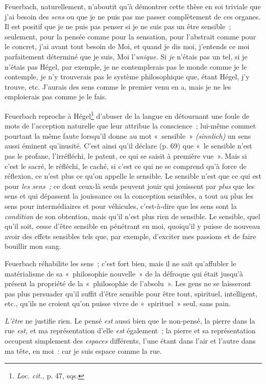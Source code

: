 \documentclass[french,twoside]{book} %
\begin{document}
Feuerbach, naturellement, n’aboutit qu’à démontrer cette thèse en soi triviale que j’ai besoin des \emph{sens} ou que je ne puis pas me passer complètement de ces organes. Il est positif que je ne puis pas penser si je ne suis pas un être sensible ; seulement, pour la pensée comme pour la sensation, pour l’abstrait comme pour le concret, j’ai avant tout besoin de Moi, et quand je dis moi, j’entends ce moi parfaitement déterminé que je suis, Moi l’\emph{unique.} Si \emph{je} n’étais pas un tel, si je n’étais pas Hégel, par exemple, je ne contemplerais pas le monde comme je le contemple, je n’y trouverais pas le système philosophique que, étant Hégel, j’y trouve, etc. J’aurais des sens comme le premier venu en a, mais je ne les emploierais pas comme je le fais.\par
Feuerbach reproche à Hégel\footnote{ \noindent \emph{Loc. cit.,} p. 47, sqs.
 } d’abuser de la langue  en détournant une foule de mots de l’acception naturelle que leur attribue la conscience ; lui-même commet pourtant la même faute lorsqu’il donne au mot « sensible » \emph{(sinnlich)} un sens aussi éminent qu’inusité. C’est ainsi qu’il déclare (p. 69) que « le sensible n’est pas le profane, l’irréfléchi, le patent, ce qui se saisit à première vue ». Mais si c’est le sacré, le réfléchi, le caché, si c’est ce qui ne se comprend qu’à force de réflexion, ce n’est plus ce qu’on appelle le sensible. Le sensible n’est que ce qui est pour \emph{les sens ;} ce dont ceux-là seuls peuvent jouir qui jouissent par \emph{plus} que les sens et qui dépassent la jouissance ou la conception sensibles, a tout au plus les sens pour intermédiaires et pour véhicules, c’est-à-dire que les sens sont la \emph{condition} de son obtention, mais qu’il n’est plus rien de sensible. Le sensible, quel qu’il soit, cesse d’être sensible en pénétrant en moi, quoiqu’il y puisse de nouveau avoir des effets sensibles tels que, par exemple, d’exciter mes passions et de faire bouillir mon sang.\par
Feuerbach réhabilite les sens ; c’est fort bien, mais il ne sait qu’affubler le matérialisme de sa « philosophie nouvelle » de la défroque qui était jusqu’à présent la propriété de la « philosophie de l’absolu ». Les gens ne se laisseront pas plus persuader qu’il suffit d’être sensible pour être tout, spirituel, intelligent, etc., qu’ils ne croient qu’on puisse vivre de « spirituel » seul, sans pain.\par
\emph{L’être} ne justifie rien. Le pensé \emph{est} aussi bien que le non-pensé, la pierre dans la rue \emph{est,} et ma représentation d’elle \emph{est} également ; la pierre et sa représentation occupent simplement des \emph{espaces} différents, l’une étant dans l’air et l’autre dans ma tête, en moi : car je suis espace comme la rue.\par
\end{document}
